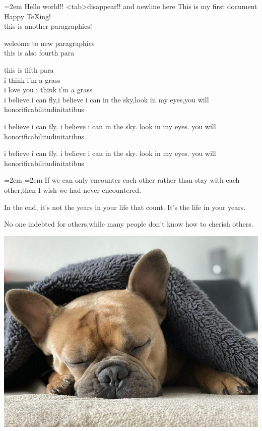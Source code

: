 \documentclass{article}
\begin{document}
  \parindent=2em
  Hello    world!!	\textless tab\textgreater disappear!!
  and newline\xspace here
  This is my first document\\
  Happy \TeX ing!\\
  this is another \qquad paragraphics!

  welcome to new paragraphics\\
  \newpage
  \indent this is also fourth para\par\addvspace{2em}
  \noindent this is\hspace{2ex} fifth para\\
  \phantom{i love you }i think i'm a grass\\
  i love you i think i'm a grass\\
  i believe i can fly,i believe i can in the sky,look in my eyes,you will honorificabilit\-udinitatibus\\
  \par
  \spaceskip=2mm
  \setlength{\parskip}{10pt}
  i believe i can f{\it l}y. i believe i can in the sky. look in my eyes. you will honorificabilitudinitatibus\par
  \xspaceskip=10mm
  i believe i can f{\it l}\/y. i believe  \vadjust{\vspace{10pt}} i can in the sky. look in my eyes. you will honorificabilit\-udinitatibus\par
  \leftskip=2em
  \rightskip=2em  
  If we can only encounter each other rather than stay with each other,then I wish we had never encountered.\par
  In the end, it’s not the years in your life that count. It’s the life in your years.\par
  No one indebted for others,while many people don't know how to cherish others.\par
  \parindent=0pt
  \includegraphics[scale=0.1]{snuggle.jpg}\par
\end{document}
